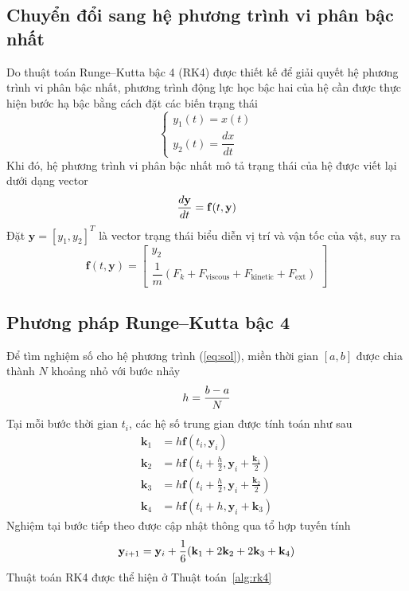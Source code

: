 \subsection{Chuyển đổi sang hệ phương trình vi phân bậc nhất}
Do thuật toán Runge--Kutta bậc 4 (RK4) được thiết kế để giải quyết hệ phương trình vi phân bậc nhất, phương trình động lực học bậc hai của hệ cần được thực hiện bước hạ bậc bằng cách đặt các biến trạng thái
\begin{equation}
\begin{cases}
y_1(t) = x(t) \\[0.5em]
y_2(t) = \dfrac{dx}{dt} 
\end{cases}
\end{equation}
Khi đó, hệ phương trình vi phân bậc nhất mô tả trạng thái của hệ được viết lại dưới dạng vector
\begin{equation}
    \frac{d\mathbf{y}}{dt} = \mathbf{f}(t, \mathbf{y}) \notag
\end{equation}
Đặt $\mathbf{y} = [y_1, y_2]^T$ là vector trạng thái biểu diễn vị trí và vận tốc của vật, suy ra
\begin{equation}
    \mathbf{f}(t,\mathbf{y})
    = \begin{bmatrix}
      y_2 \\[0.5em]
      \dfrac{1}{m} \left( F_k + F_{\text{viscous}} + F_{\text{kinetic}} + F_{\text{ext}} \right)
    \end{bmatrix}
    \label{eq:sol}
\end{equation}

\subsection{Phương pháp Runge--Kutta bậc 4}
Để tìm nghiệm số cho hệ phương trình (\ref{eq:sol}), miền thời gian $[a,b]$ được chia thành $N$ khoảng nhỏ với bước nhảy
\begin{equation}
    h=\frac{b-a}{N} \notag
\end{equation}
Tại mỗi bước thời gian $t_i$, các hệ số trung gian được tính toán như sau
\begin{equation*}
\begin{aligned}
\mathbf{k}_1 &= h \mathbf{f}(t_i, \mathbf{y}_i) \\
\mathbf{k}_2 &= h\mathbf{f}\left(t_i + \frac{h}{2}, \mathbf{y}_i + \frac{\mathbf{k}_1}{2}\right) \\
\mathbf{k}_3 &= h \mathbf{f}\left(t_i + \frac{h}{2}, \mathbf{y}_i + \frac{\mathbf{k}_2}{2}\right) \\
\mathbf{k}_4 &= h \mathbf{f}(t_i + h, \mathbf{y}_i + \mathbf{k}_3)
\end{aligned}
\end{equation*}
Nghiệm tại bước tiếp theo được cập nhật thông qua tổ hợp tuyến tính
\begin{equation}
    \mathbf{y}_{i+1} = \mathbf{y}_i + \frac{1}{6}(\mathbf{k}_1 + 2\mathbf{k}_2 + 2\mathbf{k}_3 + \mathbf{k}_4) \notag
\end{equation}
Thuật toán RK4 được thể hiện ở Thuật toán~\ref{alg:rk4}

